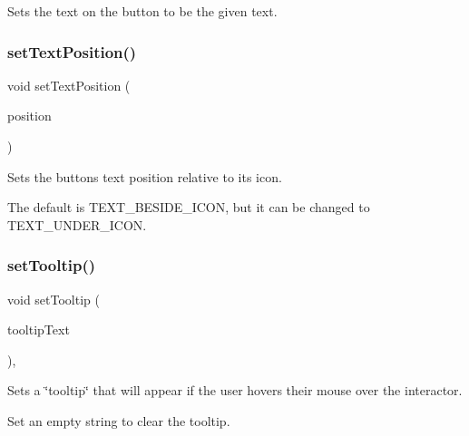 Sets the text on the button to be the given text. 

\mbox{\label{classsgl_1_1GButton_af822b8d73c652f7c59d875d7cdfc5302}} 
\subsubsection{\texorpdfstring{set\+Text\+Position()}{setTextPosition()}}
{\footnotesize\ttfamily void set\+Text\+Position (\begin{DoxyParamCaption}\item[{\mbox{\hyperlink{classsgl_1_1GInteractor_a8e0d441725a81d2bbdebbea09078260e}{G\+Interactor\+::\+Text\+Position}}}]{position }\end{DoxyParamCaption})\hspace{0.3cm}{\ttfamily [virtual]}}



Sets the button\textquotesingle{}s text position relative to its icon. 

The default is T\+E\+X\+T\+\_\+\+B\+E\+S\+I\+D\+E\+\_\+\+I\+C\+ON, but it can be changed to T\+E\+X\+T\+\_\+\+U\+N\+D\+E\+R\+\_\+\+I\+C\+ON. \mbox{\label{classsgl_1_1GInteractor_a039e0e49beaecc275efce02d416acea8}} 
\subsubsection{\texorpdfstring{set\+Tooltip()}{setTooltip()}}
{\footnotesize\ttfamily void set\+Tooltip (\begin{DoxyParamCaption}\item[{const std\+::string \&}]{tooltip\+Text }\end{DoxyParamCaption})\hspace{0.3cm}{\ttfamily [virtual]}, {\ttfamily [inherited]}}



Sets a \char`\"{}tooltip\char`\"{} that will appear if the user hovers their mouse over the interactor. 

Set an empty string to clear the tooltip. \mbox{\label{classsgl_1_1GInteractor_a18e44e30b31525a243960ca3928125aa}} 
